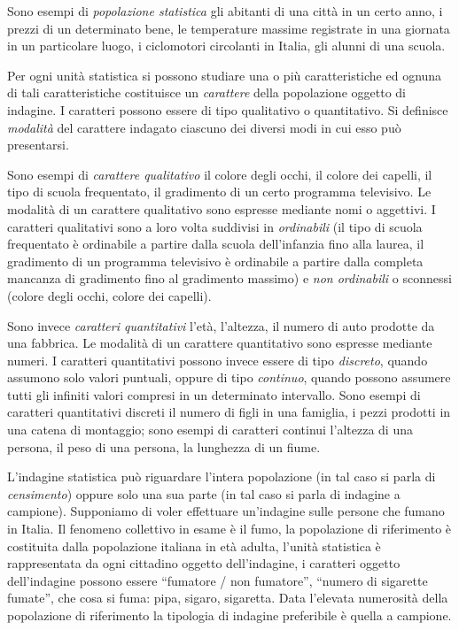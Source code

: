 Sono esempi di \emph{popolazione statistica} gli abitanti di una città in 
un certo anno, i prezzi di un determinato bene, le temperature massime 
registrate
in una giornata in un particolare luogo, i ciclomotori circolanti in 
Italia, gli alunni di una scuola.

\begin{definizione}
Per ogni unità statistica si possono studiare una o più caratteristiche ed 
ognuna di tali caratteristiche costituisce un \emph{carattere} della 
popolazione oggetto
di indagine. I caratteri possono essere di tipo qualitativo o quantitativo.
Si definisce \emph{modalità} del carattere indagato ciascuno dei diversi 
modi in cui esso può presentarsi.
\end{definizione}

Sono esempi di \emph{carattere qualitativo} il colore degli occhi, il 
colore dei capelli, il tipo di scuola frequentato, il gradimento di un 
certo programma televisivo.
Le modalità di un carattere qualitativo sono espresse mediante nomi o 
aggettivi.
I caratteri qualitativi sono a loro volta suddivisi in \emph{ordinabili} 
(il tipo di scuola frequentato è ordinabile a partire dalla scuola 
dell'infanzia fino alla laurea,
il gradimento di un programma televisivo è ordinabile a partire dalla 
completa mancanza di gradimento fino al gradimento massimo) e \emph{non 
ordinabili} o sconnessi
(colore degli occhi, colore dei capelli).

Sono invece \emph{caratteri quantitativi} l'età, l'altezza, il numero di 
auto prodotte da una fabbrica. Le modalità di un carattere quantitativo 
sono espresse mediante numeri.
I caratteri quantitativi possono invece essere di tipo \emph{discreto}, 
quando assumono solo valori puntuali, oppure di tipo \emph{continuo}, 
quando possono assumere
tutti gli infiniti valori compresi in un determinato intervallo. Sono 
esempi di caratteri quantitativi discreti il numero di figli in una 
famiglia,
i pezzi prodotti in una catena di montaggio; sono esempi di caratteri 
continui l'altezza di una persona, il peso di una persona, la lunghezza di 
un fiume.

L'indagine statistica può riguardare l'intera popolazione (in tal caso si 
parla di \emph{censimento}) oppure solo una sua parte (in tal caso si parla 
di indagine a campione).
Supponiamo di voler effettuare un'indagine sulle persone che fumano in 
Italia. Il fenomeno collettivo in esame è il fumo, la popolazione di 
riferimento
è costituita dalla popolazione italiana in età adulta, l'unità statistica è 
rappresentata da ogni cittadino oggetto dell'indagine, i caratteri oggetto
dell'indagine possono essere ``fumatore / non fumatore'', ``numero di 
sigarette fumate'', che cosa si fuma: pipa, sigaro, sigaretta. Data 
l'elevata numerosità
della popolazione di riferimento la tipologia di indagine preferibile è 
quella a campione.

